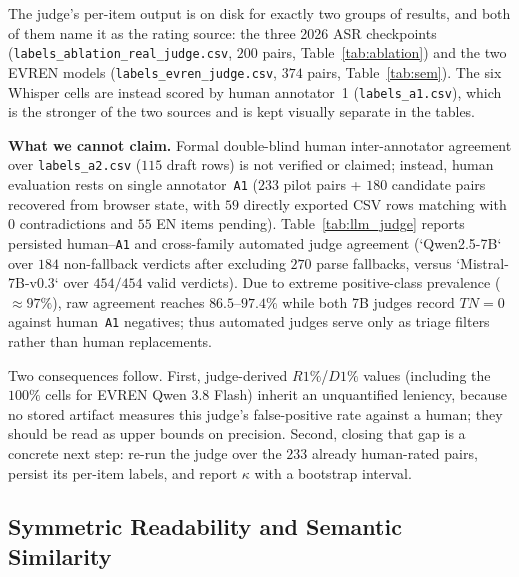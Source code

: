 \documentclass[conference]{IEEEtran}
\begin{document}
The judge's per-item output is on disk for exactly two groups of results, and both of them name it as the rating source: the three 2026 ASR checkpoints (\texttt{labels\_ablation\_real\_judge.csv}, $200$ pairs, Table~\ref{tab:ablation}) and the two EVREN models (\texttt{labels\_evren\_judge.csv}, $374$ pairs, Table~\ref{tab:sem}). The six Whisper cells are instead scored by human annotator~1 (\texttt{labels\_a1.csv}), which is the stronger of the two sources and is kept visually separate in the tables.

\textbf{What we cannot claim.} Formal double-blind human inter-annotator agreement over \texttt{labels\_a2.csv} ($115$ draft rows) is not verified or claimed; instead, human evaluation rests on single annotator~\texttt{A1} ($233$ pilot pairs + $180$ candidate pairs recovered from browser state, with $59$ directly exported CSV rows matching with $0$ contradictions and $55$ EN items pending). Table~\ref{tab:llm_judge} reports persisted human--\texttt{A1} and cross-family automated judge agreement (`Qwen2.5-7B` over $184$ non-fallback verdicts after excluding $270$ parse fallbacks, versus `Mistral-7B-v0.3` over $454/454$ valid verdicts). Due to extreme positive-class prevalence ($\approx97\%$), raw agreement reaches $86.5$--$97.4\%$ while both 7B judges record $TN=0$ against human~\texttt{A1} negatives; thus automated judges serve only as triage filters rather than human replacements.

Two consequences follow. First, judge-derived $R1\%$/$D1\%$ values (including the $100\%$ cells for EVREN Qwen 3.8 Flash) inherit an unquantified leniency, because no stored artifact measures this judge's false-positive rate against a human; they should be read as upper bounds on precision. Second, closing that gap is a concrete next step: re-run the judge over the $233$ already human-rated pairs, persist its per-item labels, and report $\kappa$ with a bootstrap interval.



\subsection{Symmetric Readability and Semantic Similarity}
\label{sec:readability}
\end{document}
